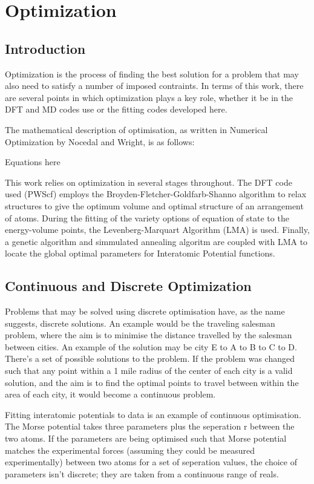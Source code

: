 \section{Optimization}

\subsection{Introduction}

Optimization is the process of finding the best solution for a problem that may also need to satisfy a number of imposed contraints.  In terms of this work, there are several points in which optimization plays a key role, whether it be in the DFT and MD codes use or the fitting codes developed here.  

The mathematical description of optimisation, as written in Numerical Optimization by Nocedal and Wright, is as follows:

Equations here

This work relies on optimization in several stages throughout.  The DFT code used (PWScf) employs the Broyden-Fletcher-Goldfarb-Shanno algorithm to relax structures to give the optimum volume and optimal structure of an arrangement of atoms.  During the fitting of the variety options of equation of state to the energy-volume points, the Levenberg-Marquart Algorithm (LMA) is used.  Finally, a genetic algorithm and simmulated annealing algoritm are coupled with LMA to locate the global optimal parameters for Interatomic Potential functions.


\subsection{Continuous and Discrete Optimization}

Problems that may be solved using discrete optimisation have, as the name suggests, discrete solutions.  An example would be the traveling salesman problem, where the aim is to minimise the distance travelled by the salesman between cities.  An example of the solution may be city E to A to B to C to D.  There's a set of possible solutions to the problem.  If the problem was changed such that any point within a 1 mile radius of the center of each city is a valid solution, and the aim is to find the optimal points to travel between within the area of each city, it would become a continuous problem.

Fitting interatomic potentials to data is an example of continuous optimisation.  The Morse potential takes three parameters plus the seperation r between the two atoms.  If the parameters are being optimised such that Morse potential matches the experimental forces (assuming they could be measured experimentally) between two atoms for a set of seperation values, the choice of parameters isn't discrete; they are taken from a continuous range of reals.



